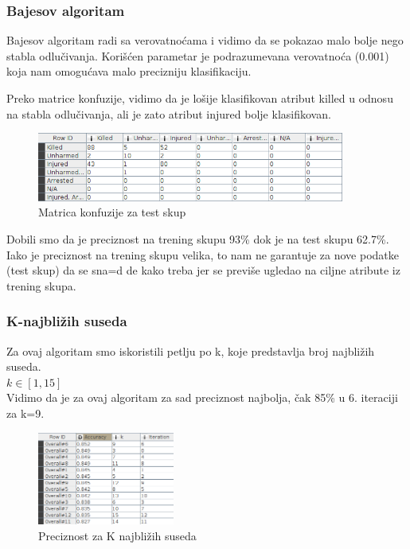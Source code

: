 \documentclass[12pt, a4paper]{article}
\def\dj{\leavevmode\setbox0=\hbox{d}\kern0pt
\rlap{\kern.215em\raise.46\ht0\hbox{-}}d}
\begin{document}
\newpage
\subsubsection{Bajesov algoritam}
Bajesov algoritam radi sa verovatno\' cama i vidimo da se pokazao malo bolje nego stabla odlu\v civanja.
Kori\v s\' cen parametar je podrazumevana verovatno\' ca (0.001) koja nam omogu\' cava malo precizniju klasifikaciju.\break

Preko matrice konfuzije, vidimo da je lo\v sije klasifikovan atribut killed u odnosu na stabla odlu\v civanja, ali je zato atribut injured bolje klasifikovan.
\begin{figure}[H]
\centering
\includegraphics[width=0.9\textwidth]{bayes_confussionMatrix_childrenKI.png}
\caption{Matrica konfuzije za test skup}
\end{figure}

Dobili smo da je preciznost na trening skupu 93\% dok je na test skupu 62.7\%.\\
Iako je preciznost na trening skupu velika, to nam ne garantuje za nove podatke (test skup) da se sna\dj e kako treba jer se previ\v se ugledao na ciljne atribute iz trening skupa.


\subsubsection{K-najbli\v zih suseda}
Za ovaj algoritam smo iskoristili petlju po k, koje predstavlja broj najbli\v zih suseda.\\
$k \in [1,15]$\\
Vidimo da je za ovaj algoritam za sad preciznost najbolja, \v cak 85\% u 6. iteraciji za k=9.

\begin{figure}[H]
\centering
\includegraphics[width=0.4\textwidth]{kNearest_accr_childrenKI.png}
\caption{Preciznost za K najbli\v zih suseda}
\end{figure}
\end{document}
